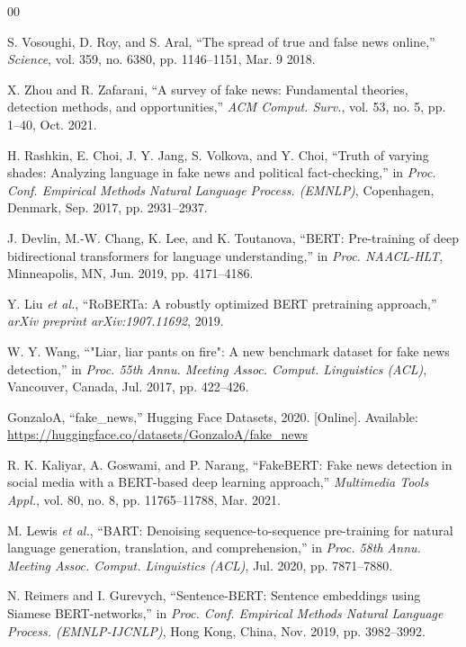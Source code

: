 \documentclass[journal]{IEEEtran}
\begin{document}
\begin{thebibliography}{00}

S. Vosoughi, D. Roy, and S. Aral, ``The spread of true and false news online,''
\textit{Science}, vol. 359, no. 6380, pp. 1146--1151, Mar. 9 2018.

X. Zhou and R. Zafarani, ``A survey of fake news: Fundamental theories, detection methods,
and opportunities,'' \textit{ACM Comput. Surv.}, vol. 53, no. 5, pp. 1--40, Oct. 2021.

H. Rashkin, E. Choi, J. Y. Jang, S. Volkova, and Y. Choi, ``Truth of varying shades:
Analyzing language in fake news and political fact-checking,'' in \textit{Proc. Conf.
Empirical Methods Natural Language Process. (EMNLP)}, Copenhagen, Denmark, Sep. 2017,
pp. 2931--2937.

J. Devlin, M.-W. Chang, K. Lee, and K. Toutanova, ``BERT: Pre-training of deep
bidirectional transformers for language understanding,'' in \textit{Proc. NAACL-HLT},
Minneapolis, MN, Jun. 2019, pp. 4171--4186.

Y. Liu \textit{et al.}, ``RoBERTa: A robustly optimized BERT pretraining approach,''
\textit{arXiv preprint arXiv:1907.11692}, 2019.

W. Y. Wang, ``"Liar, liar pants on fire": A new benchmark dataset for fake news detection,''
in \textit{Proc. 55th Annu. Meeting Assoc. Comput. Linguistics (ACL)}, Vancouver, Canada,
Jul. 2017, pp. 422--426.

GonzaloA, ``fake\_news,'' Hugging Face Datasets, 2020. [Online]. Available:
\url{https://huggingface.co/datasets/GonzaloA/fake_news}

R. K. Kaliyar, A. Goswami, and P. Narang, ``FakeBERT: Fake news detection in social media
with a BERT-based deep learning approach,'' \textit{Multimedia Tools Appl.}, vol. 80, no. 8,
pp. 11765--11788, Mar. 2021.

M. Lewis \textit{et al.}, ``BART: Denoising sequence-to-sequence pre-training for natural
language generation, translation, and comprehension,'' in \textit{Proc. 58th Annu. Meeting
Assoc. Comput. Linguistics (ACL)}, Jul. 2020, pp. 7871--7880.

N. Reimers and I. Gurevych, ``Sentence-BERT: Sentence embeddings using Siamese
BERT-networks,'' in \textit{Proc. Conf. Empirical Methods Natural Language Process.
(EMNLP-IJCNLP)}, Hong Kong, China, Nov. 2019, pp. 3982--3992.


\end{thebibliography}
\end{document}
